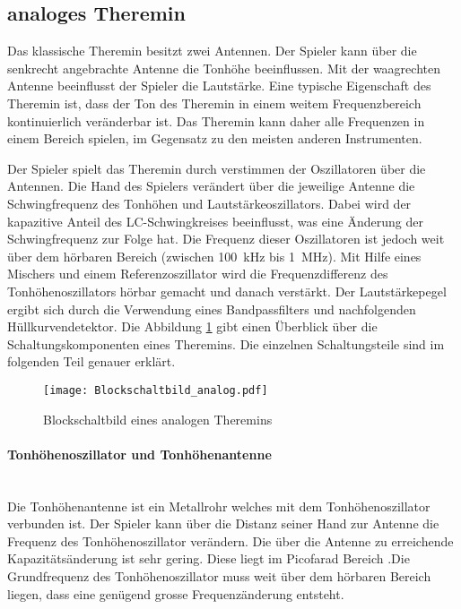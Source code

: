 \subsection{analoges Theremin}\label{subsec:Theremin_analog}
Das klassische Theremin besitzt zwei Antennen. Der Spieler kann über die senkrecht angebrachte Antenne  die  Tonhöhe beeinflussen. Mit der waagrechten Antenne beeinflusst der Spieler die Lautstärke. Eine typische Eigenschaft des Theremin ist, dass der Ton des Theremin in einem weitem Frequenzbereich kontinuierlich veränderbar ist. Das Theremin kann daher alle Frequenzen in einem Bereich spielen, im Gegensatz zu den meisten anderen Instrumenten.

Der Spieler spielt das Theremin durch verstimmen der Oszillatoren über die Antennen.
Die Hand des Spielers verändert über die jeweilige Antenne die Schwingfrequenz des Tonhöhen und Lautstärkeoszillators. Dabei wird der kapazitive Anteil des LC-Schwingkreises beeinflusst, was eine Änderung der Schwingfrequenz zur Folge hat. 
Die Frequenz dieser Oszillatoren ist jedoch weit über dem hörbaren Bereich (zwischen \SI{100}{kHz} bis \SI{1}{MHz}). Mit Hilfe eines Mischers und einem Referenzoszillator wird die Frequenzdifferenz des Tonhöhenoszillators hörbar gemacht und danach verstärkt\cite{Franzis}. Der Lautstärkepegel ergibt sich durch die Verwendung eines Bandpassfilters und nachfolgenden Hüllkurvendetektor. Die Abbildung \ref{img:Blockschaltbild_analog} gibt einen Überblick über die Schaltungskomponenten eines Theremins. Die einzelnen Schaltungsteile sind im folgenden Teil genauer erklärt.

\begin{figure}[h]
	\centering
	\texttt{[image: Blockschaltbild\_analog.pdf]}
	\caption{Blockschaltbild eines analogen Theremins}
	\label{img:Blockschaltbild_analog}
\end{figure}

\paragraph{Tonhöhenoszillator und Tonhöhenantenne}\mbox{}\\

Die Tonhöhenantenne ist ein Metallrohr welches mit dem Tonhöhenoszillator verbunden ist.
Der Spieler kann über die Distanz seiner Hand zur Antenne die Frequenz des Tonhöhenoszillator verändern. Die über die Antenne zu erreichende Kapazitätsänderung ist sehr gering. Diese liegt im Picofarad Bereich \cite{physik_theremin}.Die Grundfrequenz des Tonhöhenoszillator muss weit über dem hörbaren Bereich liegen, dass eine genügend grosse Frequenzänderung entsteht.

